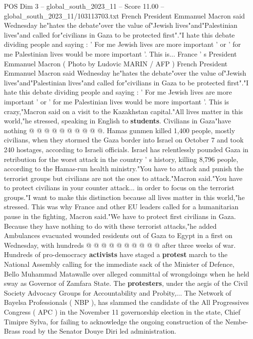 \begin{textsample}{POS Dim 3 – global\_south\_2023\_11 – Score 11.00 – global\_south\_2023\_11/103113703.txt}  \label{ex:f3_pos_351}
French President Emmanuel Macron said Wednesday he"hates the debate"over the value of"Jewish lives"and"Palestinian lives"and called for"civilians in Gaza to be protected first"."I hate this debate dividing people and saying : ' For me Jewish lives are more important ' or ' for me Palestinian lives would be more important '.
This is...
France ' s President Emmanuel Macron ( Photo by Ludovic MARIN / AFP ) French President Emmanuel Macron said Wednesday he"hates the debate"over the value of"Jewish lives"and"Palestinian lives"and called for"civilians in Gaza to be protected first"."I hate this debate dividing people and saying : ' For me Jewish lives are more important ' or ' for me Palestinian lives would be more important '.
This is crazy,"Macron said on a visit to the Kazakhstan capital."All lives matter in this world,"he stressed, speaking in English to \textbf{students}.
Civilians in Gaza"have nothing @ @ @ @ @ @ @ @ @ @.
Hamas gunmen killed 1,400 people, mostly civilians, when they stormed the Gaza border into Israel on October 7 and took 240 hostages, according to Israeli officials.
Israel has relentlessly pounded Gaza in retribution for the worst attack in the country ' s history, killing 8,796 people, according to the Hamas-run health ministry."You have to attack and punish the terrorist groups but civilians are not the ones to attack."Macron said."You have to protect civilians in your counter attack... in order to focus on the terrorist groups."I want to make this distinction because all lives matter in this world,"he stressed.
This was why France and other EU leaders called for a humanitarian pause in the fighting, Macron said."We have to protect first civilians in Gaza.
Because they have nothing to do with these terrorist attacks,"he added Ambulances evacuated wounded residents out of Gaza to Egypt in a first on Wednesday, with hundreds @ @ @ @ @ @ @ @ @ @ after three weeks of war.
Hundreds of pro-democracy \textbf{activists} have staged a \textbf{protest} march to the National Assembly calling for the immediate sack of the Minister of Defence, Bello Muhammad Matawalle over alleged committal of wrongdoings when he held sway as Governor of Zamfara State.
The \textbf{protesters}, under the aegis of the Civil Society Advocacy Groups for Accountability and Probity,...
The Network of Bayelsa Professionals ( NBP ), has slammed the candidate of the All Progressives Congress ( APC ) in the November 11 governorship election in the state, Chief Timipre Sylva, for failing to acknowledge the ongoing construction of the Nembe-Brass road by the Senator Douye Diri led administration.

\end{textsample}
